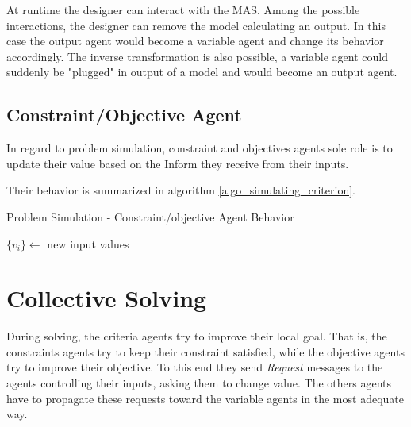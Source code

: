 At runtime the designer can interact with the MAS. Among the possible interactions, the designer can remove the model calculating an output. In this case the output agent would become a variable agent and change its behavior accordingly. The inverse transformation is also possible, a variable agent could suddenly be "plugged" in output of a model and would become an output agent.

\subsection{Constraint/Objective Agent}

In regard to problem simulation, constraint and objectives agents sole role is to update their value based on the Inform they receive from their inputs.

Their behavior is summarized in algorithm \ref{algo_simulating_criterion}.

\begin{algorithm}
\caption{Problem Simulation - Constraint/objective Agent Behavior}
\label{algo_simulating_criterion}

	$\{v_i\} \leftarrow$ new input values\;
			

\end{algorithm}

\section{Collective Solving}\label{collective_solv}

During solving, the criteria agents try to improve their local goal. That is, the constraints agents try to keep their constraint satisfied, while the objective agents try to improve their objective. To this end they send \emph{Request} messages to the agents controlling their inputs, asking them to change value. The others agents have to propagate these requests toward the variable agents in the most adequate way.

